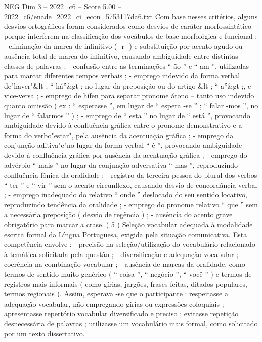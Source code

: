 \begin{textsample}{NEG Dim 3 – 2022\_c6 – Score 5.00 – 2022\_c6/enade\_2022\_ci\_econ\_5753117da6.txt}
Com base nesses critérios, alguns desvios ortográficos foram considerados como desvios de caráter morfossintático porque interferem na classificação dos vocábulos de base morfológica e funcional : - eliminação da marca de infinitivo ( -r- ) e substituição por acento agudo ou ausência total de marca do infinitivo, causando ambiguidade entre distintas classes de palavras ; - confusão entre as terminações “ ão ” e “ am ”, utilizadas para marcar diferentes tempos verbais ; - emprego indevido da forma verbal de"haver"\&lt ; “ há”\&gt ; no lugar da preposição ou do artigo \&lt ; “ a”\&gt ;, e vice-versa ; - emprego de hífen para separar pronome átono – tanto uso indevido quanto omissão ( ex : “ esperasse ”, em lugar de “ espera -se ” ; “ falar -mos ”, no lugar de “ falarmos ” ) ; - emprego de “ esta ” no lugar de “ está ”, provocando ambiguidade devido à confluência gráfica entre o pronome demonstrativo e a forma do verbo"estar", pela ausência da acentuação gráfica ; - emprego da conjunção aditiva"e"no lugar da forma verbal “ é ”, provocando ambiguidade devido à confluência gráfica por ausência da acentuação gráfica ; - emprego do advérbio “ mais ” no lugar da conjunção adversativa “ mas ”, reproduzindo confluência fônica da oralidade ; - registro da terceira pessoa do plural dos verbos “ ter ” e “ vir ” sem o acento circunflexo, causando desvio de concordância verbal ; - emprego inadequado do relativo “ onde ” deslocado do seu sentido locativo, reproduzindo tendência da oralidade ; - emprego do pronome relativo “ que ” sem a necessária preposição ( desvio de regência ) ; - ausência do acento grave obrigatório para marcar a crase. ( 5 ) Seleção vocabular adequada à modalidade escrita formal da Língua Portuguesa, exigida pela situação comunicativa.
Esta competência envolve : - precisão na seleção/utilização do vocabulário relacionado à temática solicitada pela questão ; - diversificação e adequação vocabular ; - coerência na combinação vocabular ; - ausência de marcas da oralidade, como termos de sentido muito genérico ( “ coisa ”, “ negócio ”, “ você ” ) e termos de registros mais informais ( como gírias, jargões, frases feitas, ditados populares, termos regionais ).
Assim, esperava -se que o participante : respeitasse a adequação vocabular, não empregando gírias ou expressões coloquiais ; apresentasse repertório vocabular diversificado e preciso ; evitasse repetição desnecessária de palavras ; utilizasse um vocabulário mais formal, como solicitado por um texto dissertativo.

\end{textsample}

